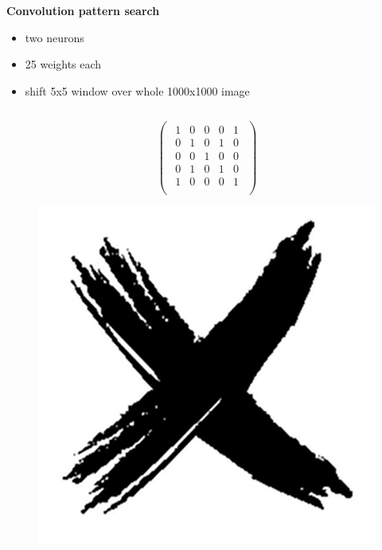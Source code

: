 \documentclass[xcolor=dvipsnames]{beamer}
\begin{document}
\begin{frame}{\bf Convolution pattern search}

\begin{itemize}
    \item two neurons
    \item 25 weights each
    \item shift 5x5 window over whole 1000x1000 image
\end{itemize}

\begin{columns}


    \begin{column}{0.5\textwidth}

    {\tiny
        \begin{equation*}
        \begin{pmatrix}
        \begin{array}{rrrrr}
            1  & 0 & 0 & 0 & 1\\
            0  & 1 & 0 & 1 & 0 \\
            0  & 0 & 1 & 0 & 0 \\
            0  & 1 & 0 & 1 & 0 \\
            1  & 0 & 0 & 0 & 1 \\
        \end{array}
        \end{pmatrix}
        \end{equation*}
    }

    \begin{figure}
      \includegraphics[scale=0.05]{../../diagrams/nn/x.png}
    \end{figure}


\end{column}
\end{columns}
\end{frame}
\end{document}
